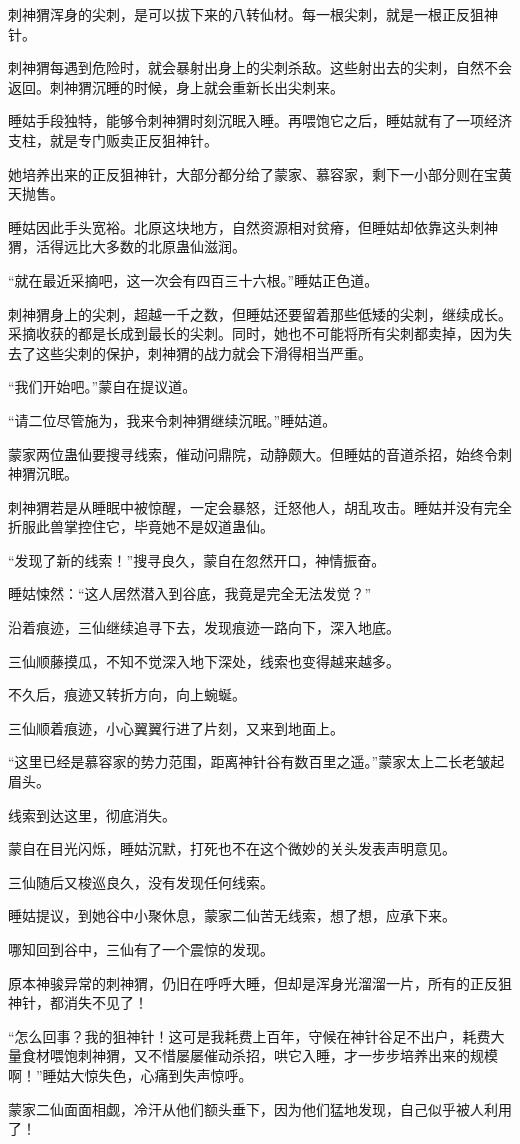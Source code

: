 \begin{this_body}
刺神猬浑身的尖刺，是可以拔下来的八转仙材。每一根尖刺，就是一根正反狙神针。

刺神猬每遇到危险时，就会暴射出身上的尖刺杀敌。这些射出去的尖刺，自然不会返回。刺神猬沉睡的时候，身上就会重新长出尖刺来。

睡姑手段独特，能够令刺神猬时刻沉眠入睡。再喂饱它之后，睡姑就有了一项经济支柱，就是专门贩卖正反狙神针。

她培养出来的正反狙神针，大部分都分给了蒙家、慕容家，剩下一小部分则在宝黄天抛售。

睡姑因此手头宽裕。北原这块地方，自然资源相对贫瘠，但睡姑却依靠这头刺神猬，活得远比大多数的北原蛊仙滋润。

“就在最近采摘吧，这一次会有四百三十六根。”睡姑正色道。

刺神猬身上的尖刺，超越一千之数，但睡姑还要留着那些低矮的尖刺，继续成长。采摘收获的都是长成到最长的尖刺。同时，她也不可能将所有尖刺都卖掉，因为失去了这些尖刺的保护，刺神猬的战力就会下滑得相当严重。

“我们开始吧。”蒙自在提议道。

“请二位尽管施为，我来令刺神猬继续沉眠。”睡姑道。

蒙家两位蛊仙要搜寻线索，催动问鼎院，动静颇大。但睡姑的音道杀招，始终令刺神猬沉眠。

刺神猬若是从睡眠中被惊醒，一定会暴怒，迁怒他人，胡乱攻击。睡姑并没有完全折服此兽掌控住它，毕竟她不是奴道蛊仙。

“发现了新的线索！”搜寻良久，蒙自在忽然开口，神情振奋。

睡姑悚然：“这人居然潜入到谷底，我竟是完全无法发觉？”

沿着痕迹，三仙继续追寻下去，发现痕迹一路向下，深入地底。

三仙顺藤摸瓜，不知不觉深入地下深处，线索也变得越来越多。

不久后，痕迹又转折方向，向上蜿蜒。

三仙顺着痕迹，小心翼翼行进了片刻，又来到地面上。

“这里已经是慕容家的势力范围，距离神针谷有数百里之遥。”蒙家太上二长老皱起眉头。

线索到达这里，彻底消失。

蒙自在目光闪烁，睡姑沉默，打死也不在这个微妙的关头发表声明意见。

三仙随后又梭巡良久，没有发现任何线索。

睡姑提议，到她谷中小聚休息，蒙家二仙苦无线索，想了想，应承下来。

哪知回到谷中，三仙有了一个震惊的发现。

原本神骏异常的刺神猬，仍旧在呼呼大睡，但却是浑身光溜溜一片，所有的正反狙神针，都消失不见了！

“怎么回事？我的狙神针！这可是我耗费上百年，守候在神针谷足不出户，耗费大量食材喂饱刺神猬，又不惜屡屡催动杀招，哄它入睡，才一步步培养出来的规模啊！”睡姑大惊失色，心痛到失声惊呼。

蒙家二仙面面相觑，冷汗从他们额头垂下，因为他们猛地发现，自己似乎被人利用了！

\end{this_body}

